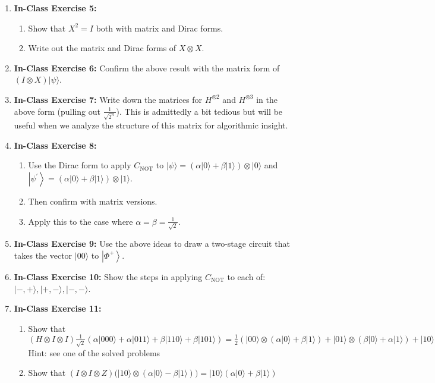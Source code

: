 \documentclass[main.tex]{subfiles}
\begin{document}
\begin{enumerate}
\item[] \textbf{In-Class Exercise 5:}
\begin{enumerate}
    \item[1.] Show that $X^{2}=I$ both with matrix and Dirac forms.
    \item[2.] Write out the matrix and Dirac forms of $X \otimes X$.
\end{enumerate}

\item[] \textbf{In-Class Exercise 6:} Confirm the above result with the matrix form of $(I \otimes X)|\psi\rangle$.

\item[] \textbf{In-Class Exercise 7:} Write down the matrices for $H^{\otimes 2}$ and  $H^{\otimes 3}$ in the above form (pulling out $\frac{1}{\sqrt{2^{n}}}$). This is admittedly a bit tedious but will be useful when we analyze the structure of this matrix for algorithmic insight.

\item[] \textbf{In-Class Exercise 8:}
    \begin{enumerate}
        \item[1.] Use the Dirac form to apply $C_{\text{NOT}}$ to $|\psi\rangle=(\alpha|0\rangle+\beta|1\rangle) \otimes |0\rangle$ and $\left|\psi^{\prime}\right\rangle=(\alpha|0\rangle+\beta|1\rangle) \otimes |1\rangle$. 
        \item[2.] Then confirm with matrix versions.
        \item[3.] Apply this to the case where $\alpha=\beta=\frac{1}{\sqrt{2}}$.
    \end{enumerate}

\item[] \textbf{In-Class Exercise 9:} Use the above ideas to draw a two-stage circuit that takes the vector $|00\rangle$ to $\left|\Phi^{+}\right\rangle$.

\item[] \textbf{In-Class Exercise 10:} Show the steps in applying $C_{\text{NOT}}$ to each of: $|-,+\rangle,|+,-\rangle,|-,-\rangle$.


\item[] \textbf{In-Class Exercise 11:}
\begin{enumerate}
    \item [1.] Show that $(H \otimes I \otimes I) \frac{1}{\sqrt{2}}(\alpha|000\rangle+\alpha|011\rangle+\beta|110\rangle+\beta|101\rangle)=\frac{1}{2}(|00\rangle \otimes(\alpha|0\rangle+\beta|1\rangle)+|01\rangle \otimes(\beta|0\rangle+\alpha|1\rangle)+|10\rangle \otimes(\alpha|0\rangle-\beta|1\rangle)+|11\rangle \otimes(\alpha|1\rangle-\beta|0\rangle))$ Hint: see one of the solved problems
    \item [2.] Show that $(I \otimes I \otimes Z)(|10\rangle \otimes(\alpha|0\rangle-\beta|1\rangle))=|10\rangle(\alpha|0\rangle+\beta|1\rangle)$
\end{enumerate}

\end{enumerate}
\end{document}
